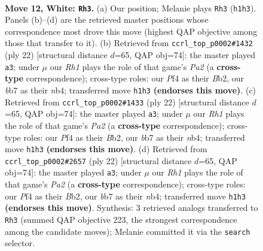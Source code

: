 \documentclass[11pt]{article}
\begin{document}
\clearpage

\begin{figure}[p]\centering
\begin{subfigure}{0.46\textwidth}\centering
\resizebox{\linewidth}{!}{%
\newchessgame
\chessboard[
  setfen={r3kbnr/pbpp1ppp/4q3/4P3/2p2PPP/2P5/PP2Q3/RNB1KB1R w KQkq - 1 12},
  showmover=false,
  pgfstyle=straightmove, color=movearrow, markmove={h1-h3}
]}
\caption{}
\end{subfigure}\hfill
\begin{subfigure}{0.46\textwidth}\centering
\resizebox{\linewidth}{!}{%
\newchessgame
\chessboard[
  setfen={r3k2r/p1ppqpbp/b1p3p1/4P3/1nP5/1P6/PB2QPPP/RN2KB1R w KQkq - 4 12},
  showmover=false,
  pgfstyle=straightmove, color=movearrow, markmove={a2-a3}
]}
\caption{}
\end{subfigure}
\\[4pt]
\begin{subfigure}{0.46\textwidth}\centering
\resizebox{\linewidth}{!}{%
\newchessgame
\chessboard[
  setfen={r3k2r/p1ppqpbp/b1p3p1/4P3/1nP5/1P6/PB2QPPP/RN2KB1R w KQkq - 4 12},
  showmover=false,
  pgfstyle=straightmove, color=movearrow, markmove={a2-a3}
]}
\caption{}
\end{subfigure}\hfill
\begin{subfigure}{0.46\textwidth}\centering
\resizebox{\linewidth}{!}{%
\newchessgame
\chessboard[
  setfen={r3k2r/p1ppqpbp/b1p3p1/4P3/1nP5/1P6/PB2QPPP/RN2KB1R w KQkq - 4 12},
  showmover=false,
  pgfstyle=straightmove, color=movearrow, markmove={a2-a3}
]}
\caption{}
\end{subfigure}
\caption{\textbf{Move 12, White: \texttt{Rh3}.} (a) Our position; Melanie plays \texttt{Rh3} (\texttt{h1h3}). Panels (b)--(d) are the retrieved master positions whose correspondence most drove this move (highest QAP objective among those that transfer to it). (b) Retrieved from \texttt{ccrl\_top\_p0002\#1432} (ply 22) [structural distance $d$=65, QAP obj=74]: the master played \texttt{a3}; under $\mu$ our \emph{Rh1} plays the role of that game's \emph{Pa2} (a \textbf{cross-type} correspondence); cross-type roles: our \emph{P}f4 as their \emph{B}b2, our \emph{b}b7 as their \emph{n}b4; transferred move \texttt{h1h3} \textbf{(endorses this move)}. (c) Retrieved from \texttt{ccrl\_top\_p0002\#1433} (ply 22) [structural distance $d$=65, QAP obj=74]: the master played \texttt{a3}; under $\mu$ our \emph{Rh1} plays the role of that game's \emph{Pa2} (a \textbf{cross-type} correspondence); cross-type roles: our \emph{P}f4 as their \emph{B}b2, our \emph{b}b7 as their \emph{n}b4; transferred move \texttt{h1h3} \textbf{(endorses this move)}. (d) Retrieved from \texttt{ccrl\_top\_p0002\#2657} (ply 22) [structural distance $d$=65, QAP obj=74]: the master played \texttt{a3}; under $\mu$ our \emph{Rh1} plays the role of that game's \emph{Pa2} (a \textbf{cross-type} correspondence); cross-type roles: our \emph{P}f4 as their \emph{B}b2, our \emph{b}b7 as their \emph{n}b4; transferred move \texttt{h1h3} \textbf{(endorses this move)}. Synthesis: 3 retrieved analogs transferred to \texttt{Rh3} (summed QAP objective 223, the strongest correspondence among the candidate moves); Melanie committed it via the \texttt{search} selector.}
\label{fig:thought-m22}
\end{figure}
\end{document}
